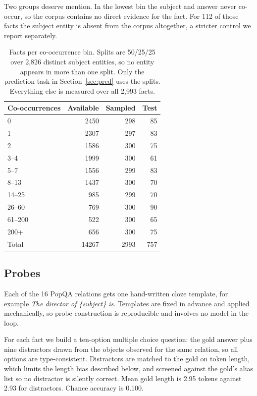 \documentclass[11pt]{article}
\begin{document}
Two groups deserve mention. In the lowest bin the subject and answer never co-occur, so the
corpus contains no direct evidence for the fact. For 112 of those facts the subject entity is
absent from the corpus altogether, a stricter control we report separately.

\begin{table}[t]
\centering\small
\begin{tabular}{lrrr}
\toprule
\textbf{Co-occurrences} & \textbf{Available} & \textbf{Sampled} & \textbf{Test} \\
\midrule
0 & 2450 & 298 & 85 \\
1 & 2307 & 297 & 83 \\
2 & 1586 & 300 & 75 \\
3--4 & 1999 & 300 & 61 \\
5--7 & 1556 & 299 & 83 \\
8--13 & 1437 & 300 & 70 \\
14--25 & 985 & 299 & 70 \\
26--60 & 769 & 300 & 90 \\
61--200 & 522 & 300 & 65 \\
200+ & 656 & 300 & 75 \\
\midrule
Total & 14267 & 2993 & 757 \\
\bottomrule
\end{tabular}
\caption{Facts per co-occurrence bin. Splits are 50/25/25 over 2{,}826 distinct subject entities,
so no entity appears in more than one split. Only the prediction task in Section~\ref{sec:pred}
uses the splits. Everything else is measured over all 2{,}993 facts.}
\label{tab:data}
\end{table}

\subsection{Probes}

Each of the 16 PopQA relations gets one hand-written cloze template, for example
\textit{The director of \{subject\} is}. Templates are fixed in advance and applied
mechanically, so probe construction is reproducible and involves no model in the loop.

For each fact we build a ten-option multiple choice question: the gold answer plus nine
distractors drawn from the objects observed for the same relation, so all options are
type-consistent. Distractors are matched to the gold on token length, which limits the
length bias described below, and screened against the gold's alias list so no distractor
is silently correct. Mean gold length is 2.95 tokens against 2.93 for distractors. Chance
accuracy is 0.100.
\end{document}

